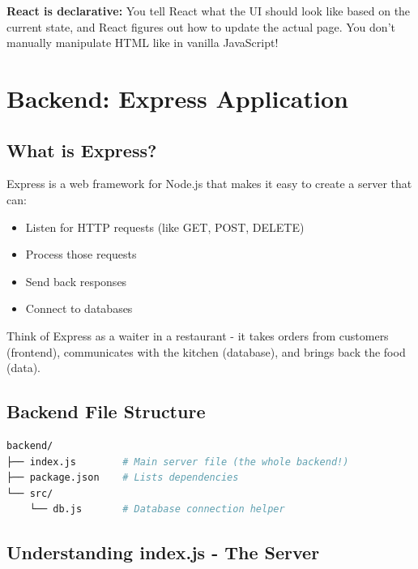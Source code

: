 \documentclass[12pt,a4paper]{article}
\begin{document}
\begin{tcolorbox}[colback=yellow!5!white,colframe=yellow!75!black,title=Important Concept]
\textbf{React is declarative:} You tell React what the UI should look like based on the current state, and React figures out how to update the actual page. You don't manually manipulate HTML like in vanilla JavaScript!
\end{tcolorbox}

\section{Backend: Express Application}

\subsection{What is Express?}

Express is a web framework for Node.js that makes it easy to create a server that can:
\begin{itemize}
    \item Listen for HTTP requests (like GET, POST, DELETE)
    \item Process those requests
    \item Send back responses
    \item Connect to databases
\end{itemize}

Think of Express as a waiter in a restaurant - it takes orders from customers (frontend), communicates with the kitchen (database), and brings back the food (data).

\subsection{Backend File Structure}

\begin{lstlisting}[language=bash, numbers=none]
backend/
├── index.js        # Main server file (the whole backend!)
├── package.json    # Lists dependencies
└── src/
    └── db.js       # Database connection helper
\end{lstlisting}

\subsection{Understanding index.js - The Server}
\end{document}
